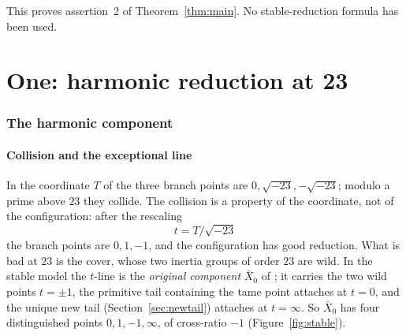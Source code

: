 \documentclass[11pt]{amsart}
\newcommand{\sqm}{\sqrt{-23}}
\theoremstyle{plain}
\theoremstyle{definition}
\begin{document}
This proves assertion~2 of Theorem~\ref{thm:main}. No
stable-reduction formula has been used.

\part{One: harmonic reduction at 23}

\section{The harmonic component}\label{sec:collision}

\subsection{Collision and the exceptional line}

In the coordinate $T$ of \cite{HJLPPZ} the three branch points are
$0,\sqm,-\sqm$; modulo a prime above $23$ they collide. The collision
is a property of the coordinate, not of the configuration: after the
rescaling
\[
  t=T/\sqm
\]
the branch points are $0,1,-1$, and the configuration has good
reduction. What is bad at $23$ is the cover, whose two inertia groups
of order $23$ are wild. In the stable model the $t$-line is the
\emph{original component} $\bar X_0$ of \cite{Wewers}; it carries the
two wild points $t=\pm1$, the primitive tail containing the tame point
attaches at $t=0$, and the unique new tail (Section~\ref{sec:newtail})
attaches at $t=\infty$. So $\bar X_0$ has four distinguished points
$0,1,-1,\infty$, of cross-ratio $-1$ (Figure~\ref{fig:stable}).
\end{document}
